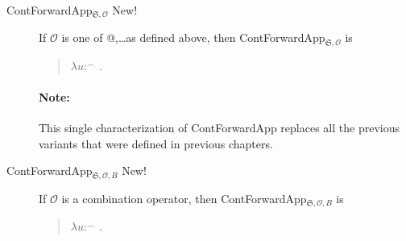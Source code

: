 \begin{description}
    
    
\item[\textnormal{ContForwardApp$_{\mathfrak{S},\mathcal{O}}$} New!]
  \mbox{}

  If $\mathcal{O}$ is one of @,\ldots as defined above, then
ContForwardApp$_{\mathfrak{S},\mathcal{O}}$ is
\begin{quote}
  $\lambda u$:$^\frown$ . 
\end{quote}

\paragraph{Note:}  This single characterization of ContForwardApp
replaces all the previous variants that were defined in previous
chapters.

\item[\textnormal{ContForwardApp$_{\mathfrak{S},\mathcal{O},B}$} New!]
  \mbox{}

  If $\mathcal{O}$ is a combination operator, then
  ContForwardApp$_{\mathfrak{S},\mathcal{O},B}$ is
  \begin{quote}
    $\lambda u$:$^\frown$ . 
  \end{quote}






\end{description}
